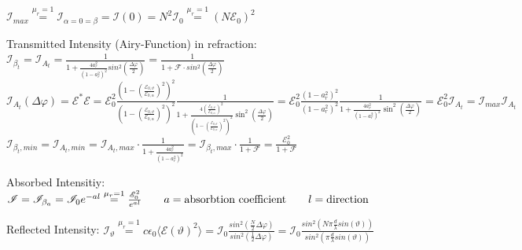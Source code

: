 $
\mathscr{I}_{max}
\stackrel{\mu_{r}=1}{=}
\mathscr{I}_{\alpha=0=\beta} = 
\mathscr{I}(0) = 
N^2 \mathscr{I}_{0}
\stackrel{\mu_{r}=1}{=}
\left( N \mathscr{E}_0 \right)^2
$


\vspace{3ex} \noindent
Transmitted Intensity (Airy-Function) in refraction:
\newline \vspace{2ex}
$
\mathscr{I}_{\beta_t} = \mathscr{I}_{A_t} = 
\frac{1}{1 + \frac{4 a_r^2}{(1-a_r^2)^2} sin^2(\frac{\Delta\varphi}{2}) } = 
\frac{1}{ 1 + \mathcal{F} \cdot sin^2(\frac{\Delta\varphi}{2}) }
$
\newline \vspace{2ex}
$
\mathscr{I}_{A_t}(\Delta\varphi) = 
\mathscr{E}^*\mathscr{E} = 
\mathscr{E}_{0}^2 \frac{ \left( 1 - \left( \frac{\mathscr{E}_{0,\vartheta}}{\mathscr{E}_{0,\alpha}} \right)^2 \right)^2 }{ \left( 1 - \left( \frac{\mathscr{E}_{0,\vartheta}}{\mathscr{E}_{0,\alpha}} \right)^2 \right)^2 } \frac{1}{1+\frac{ 4 \left( \frac{\mathscr{E}_{0,\vartheta}}{\mathscr{E}_{0,\alpha}} \right)^2 }{  \left( 1 - \left( \frac{\mathscr{E}_{0,\vartheta}}{\mathscr{E}_{0,\alpha}} \right)^2 \right)^2 } \sin^2(\frac{\Delta\varphi}{2}) } = 
\mathscr{E}_{0}^2 \frac{ \left( 1 - a_r^2 \right)^2 }{ \left( 1 - a_r^2 \right)^2 } \frac{1}{1+\frac{ 4a_r^2 }{  \left( 1 - a_r^2 \right)^2 } \sin^2(\frac{\Delta\varphi}{2}) } = 
\mathscr{E}_0^2 \mathscr{I}_{A_t} = 
\mathscr{I}_{max} \mathscr{I}_{A_t}
$
\newline \vspace{2ex}
$
\mathscr{I}_{\beta_t,min} =
\mathscr{I}_{A_t,min} =
\mathscr{I}_{A_t,max} \cdot \frac{1}{1 + {\frac{4 a_r^2}{(1-a_r^2)^2}} } = 
\mathscr{I}_{\beta_t,max} \cdot \frac{1}{1 + \mathcal{F}} = 
\frac{ \mathscr{E}_0^2}{1 + \mathcal{F} }
$


\vspace{3ex} \noindent
Absorbed Intensitiy:
\newline \vspace{2ex}
$
\mathscr{I} = 
\mathscr{I}_{\beta_a} = 
\mathscr{I}_0 e^{-al} 
\stackrel{\mu_r = 1}{=}
\frac{\mathscr{E}_0^2}{e^{al}}	
\qquad	a = \textnormal{absorbtion coefficient}	
\qquad	l = \textnormal{direction}
$


\vspace{3ex} \noindent
Reflected Intensity:
\newline \vspace{2ex}
$
\mathscr{I}_{\vartheta}
\stackrel{\mu_{r}=1}{=}
c \epsilon_0 \langle \mathscr{E(\vartheta)}^2 \rangle =
\mathscr{I}_0 \frac{sin^2 \left (\frac{N}{2} \Delta \varphi \right)}{sin^2 \left( \frac{1}{2} \Delta \varphi \right)} = 
\mathscr{I}_0 \frac{sin^2 \left( N \pi \frac{d}{\lambda} sin(\vartheta) \right) }{sin^2 \left( \pi \frac{d}{\lambda} sin(\vartheta) \right) } 
$


